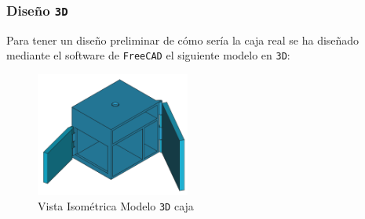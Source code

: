 \subsubsection{Diseño \texttt{3D}}

Para tener un diseño preliminar de cómo sería la caja real se ha diseñado mediante el software de \texttt{FreeCAD} el siguiente modelo en \texttt{3D}:

\begin{figure}[H]
    \centering
    \includegraphics[width=0.45\textwidth]{images/4-DesarrolloTeorico/4-1-caja/CAJA_3D_ISOMETRICA.png}
    \caption{Vista Isométrica Modelo \texttt{3D} caja}
    \label{fig:DesarrolloTeorico/Caja/CAJA_3D_ISOMETRICA}
\end{figure}

